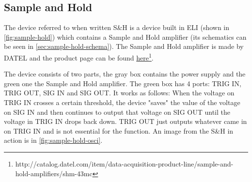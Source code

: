 \documentclass[a4paper, 10pt]{article}
\begin{document}
\subsection{Sample and Hold}\label{subsec:sample-hold}
The device referred to when written S\&H is a device built in ELI (shown in \cref{fig:sample-hold}) which contains a Sample and Hold amplifier (its schematics can be seen in \cref{sec:sample-hold-schema}).
The Sample and Hold amplifier is made by DATEL and the product page can be found \href{http://catalog.datel.com/item/data-acquisition-product-line/sample-and-hold-amplifiers/shm-43mc}{here}\footnote{http://catalog.datel.com/item/data-acquisition-product-line/sample-and-hold-amplifiers/shm-43mc}.

The device consists of two parts, the gray box contains the power supply and the green one the Sample and Hold amplifier.
The green box has 4 ports: TRIG IN, TRIG OUT, SIG IN and SIG OUT.
It works as follows: When the voltage on TRIG IN crosses a certain threshold, the device "saves" the value of the voltage on SIG IN and then continues to output that voltage on SIG OUT until the voltage in TRIG IN drops back down.
TRIG OUT just outputs whatever came in on TRIG IN and is not essential for the function.
An image from the S\&H in action is in \cref{fig:sample-hold-osci}.
\end{document}

